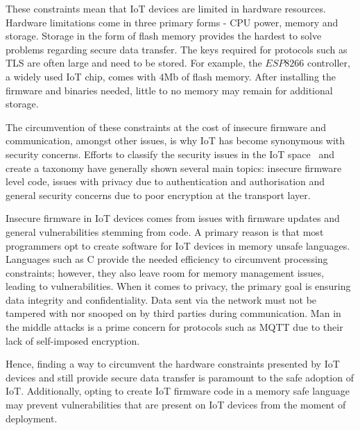 These constraints mean that IoT devices are limited in hardware resources.
Hardware limitations come in three primary forms - CPU power, memory and storage.
Storage in the form of flash memory provides the hardest to solve problems regarding secure data transfer.
The keys required for protocols such as TLS are often large and need to be stored.
For example, the $ESP8266$ controller, a widely used IoT chip, comes with $4$Mb of flash memory.
After installing the firmware and binaries needed, little to no memory may remain for additional storage.

The circumvention of these constraints at the cost of insecure firmware and communication, amongst other issues, is why IoT has become synonymous with security concerns.
Efforts to classify the security issues in the IoT space~\citep{alaba_internet_2017,gupta_security_2021,swamy_security_2017} and create a taxonomy have generally shown several main topics: insecure firmware level code, issues with privacy due to authentication and authorisation and general security concerns due to poor encryption at the transport layer.

Insecure firmware in IoT devices comes from issues with firmware updates and general vulnerabilities stemming from code.
A primary reason is that most programmers opt to create software for IoT devices in memory unsafe languages.
Languages such as C provide the needed efficiency to circumvent processing constraints; however, they also leave room for memory management issues, leading to vulnerabilities.
When it comes to privacy, the primary goal is ensuring data integrity and confidentiality.
Data sent via the network must not be tampered with nor snooped on by third parties during communication.
Man in the middle attacks is a prime concern for protocols such as MQTT due to their lack of self-imposed encryption.

Hence, finding a way to circumvent the hardware constraints presented by IoT devices and still provide secure data transfer is paramount to the safe adoption of IoT.
Additionally, opting to create IoT firmware code in a memory safe language may prevent vulnerabilities that are present on IoT devices from the moment of deployment.
